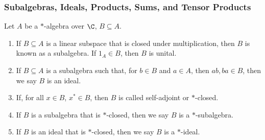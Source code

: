 \documentclass[10pt]{mypackage}
\begin{document}
\subsubsection{Subalgebras, Ideals, Products, Sums, and Tensor Products}%
\begin{definition}
  Let $A$ be a $\ast$-algebra over $\C$, $B\subseteq A$.
  \begin{enumerate}[(1)]
    \item If $B\subseteq A$ is a linear subspace that is closed under multiplication, then $B$ is known as a subalgebra. If $1_A\in B$, then $B$ is unital.
    \item If $B\subseteq A$ is a subalgebra such that, for $b\in B$ and $a\in A$, then $ab,ba\in B$, then we say $B$ is an ideal.
    \item If, for all $x\in B$, $x^{\ast}\in B$, then $B$ is called self-adjoint or $\ast$-closed.
    \item If $B$ is a subalgebra that is $\ast$-closed, then we say $B$ is a $\ast$-subalgebra.
    \item If $B$ is an ideal that is $\ast$-closed, then we say $B$ is a $\ast$-ideal.
  \end{enumerate}
\end{definition}
\end{document}
